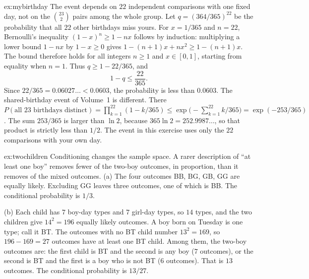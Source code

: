 \begin{solution}{ex:mybirthday}
\idea The event depends on $22$ independent comparisons with one fixed day, not on the $\binom{23}2$ pairs among the whole group.
\writeup Let $q=(364/365)^{22}$ be the probability that all $22$ other birthdays miss yours. For $x=1/365$ and $n=22$, Bernoulli's inequality $(1-x)^n\ge1-nx$ follows by induction: multiplying a lower bound $1-nx$ by $1-x\ge0$ gives $1-(n+1)x+nx^2\ge1-(n+1)x$. The bound therefore holds for all integers $n\ge1$ and $x\in[0,1]$, starting from equality when $n=1$. Thus $q\ge1-22/365$, and
\[
 1-q\le\frac{22}{365}.
\]
Since $22/365=0.06027\ldots<0.0603$, the probability is less than $0.0603$. The shared-birthday event of Volume~1 is different. There $P(\text{all }23\text{ birthdays distinct})=\prod_{k=1}^{22}(1-k/365)\le\exp\bigl(-\sum_{k=1}^{22}k/365\bigr)=\exp(-253/365)$. The sum $253/365$ is larger than $\ln2$, because $365\ln2=252.9987\ldots$, so that product is strictly less than $1/2$. The event in this exercise uses only the $22$ comparisons with your own day.
\end{solution}

\begin{solution}{ex:twochildren}
\idea Conditioning changes the sample space. A rarer description of ``at least one boy'' removes fewer of the two-boy outcomes, in proportion, than it removes of the mixed outcomes.
\writeup (a) The four outcomes BB, BG, GB, GG are equally likely. Excluding GG leaves three outcomes, one of which is BB. The conditional probability is $1/3$.

(b) Each child has $7$ boy-day types and $7$ girl-day types, so $14$ types, and the two children give $14^2=196$ equally likely outcomes. A boy born on Tuesday is one type; call it BT. The outcomes with no BT child number $13^2=169$, so $196-169=27$ outcomes have at least one BT child. Among them, the two-boy outcomes are: the first child is BT and the second is any boy ($7$ outcomes), or the second is BT and the first is a boy who is not BT ($6$ outcomes). That is $13$ outcomes. The conditional probability is $13/27$.
\end{solution}

